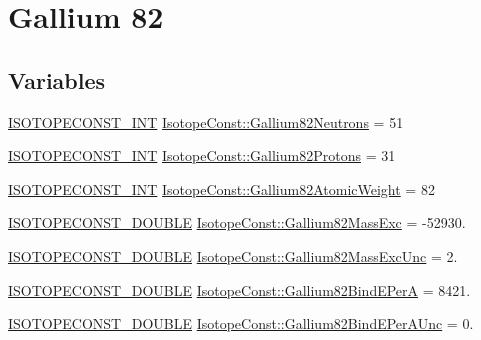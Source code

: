 \hypertarget{group___isotope_const-_gallium-_ga82}{}\section{Gallium 82}
\label{group___isotope_const-_gallium-_ga82}
\subsection*{Variables}
\begin{DoxyCompactItemize}
\item 
\mbox{\hyperlink{group___isotope_const-_macros_ga5f18360b3e99483a35c32d789e62621c}{I\+S\+O\+T\+O\+P\+E\+C\+O\+N\+S\+T\+\_\+\+I\+NT}} \mbox{\hyperlink{group___isotope_const-_gallium-_ga82_ga7764e522b261f6c85810ae48a3ffac6b}{Isotope\+Const\+::\+Gallium82\+Neutrons}} = 51
\item 
\mbox{\hyperlink{group___isotope_const-_macros_ga5f18360b3e99483a35c32d789e62621c}{I\+S\+O\+T\+O\+P\+E\+C\+O\+N\+S\+T\+\_\+\+I\+NT}} \mbox{\hyperlink{group___isotope_const-_gallium-_ga82_gafe9103b29c5fe4bb7750162cb216dc5b}{Isotope\+Const\+::\+Gallium82\+Protons}} = 31
\item 
\mbox{\hyperlink{group___isotope_const-_macros_ga5f18360b3e99483a35c32d789e62621c}{I\+S\+O\+T\+O\+P\+E\+C\+O\+N\+S\+T\+\_\+\+I\+NT}} \mbox{\hyperlink{group___isotope_const-_gallium-_ga82_ga0cad50ea6170853daa99dfa2ee3ab976}{Isotope\+Const\+::\+Gallium82\+Atomic\+Weight}} = 82
\item 
\mbox{\hyperlink{group___isotope_const-_macros_ga8f45a7272ce02c0b4c65c44636ed719a}{I\+S\+O\+T\+O\+P\+E\+C\+O\+N\+S\+T\+\_\+\+D\+O\+U\+B\+LE}} \mbox{\hyperlink{group___isotope_const-_gallium-_ga82_ga653a7b2b2922291633cbbfc9036fc405}{Isotope\+Const\+::\+Gallium82\+Mass\+Exc}} = -\/52930.
\item 
\mbox{\hyperlink{group___isotope_const-_macros_ga8f45a7272ce02c0b4c65c44636ed719a}{I\+S\+O\+T\+O\+P\+E\+C\+O\+N\+S\+T\+\_\+\+D\+O\+U\+B\+LE}} \mbox{\hyperlink{group___isotope_const-_gallium-_ga82_ga72fb775009f284ce902a6303eb444278}{Isotope\+Const\+::\+Gallium82\+Mass\+Exc\+Unc}} = 2.
\item 
\mbox{\hyperlink{group___isotope_const-_macros_ga8f45a7272ce02c0b4c65c44636ed719a}{I\+S\+O\+T\+O\+P\+E\+C\+O\+N\+S\+T\+\_\+\+D\+O\+U\+B\+LE}} \mbox{\hyperlink{group___isotope_const-_gallium-_ga82_ga80119bcc538cfc546d5a51df7dd1e73d}{Isotope\+Const\+::\+Gallium82\+Bind\+E\+PerA}} = 8421.
\item 
\mbox{\hyperlink{group___isotope_const-_macros_ga8f45a7272ce02c0b4c65c44636ed719a}{I\+S\+O\+T\+O\+P\+E\+C\+O\+N\+S\+T\+\_\+\+D\+O\+U\+B\+LE}} \mbox{\hyperlink{group___isotope_const-_gallium-_ga82_gacbd26fcd7e1f34742c7b23426e5229e3}{Isotope\+Const\+::\+Gallium82\+Bind\+E\+Per\+A\+Unc}} = 0.

\end{DoxyCompactItemize}
